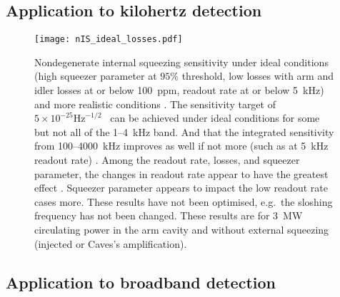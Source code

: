 \subsection{Application to kilohertz detection}

\begin{figure}
    \centering
    \texttt{[image: nIS\_ideal\_losses.pdf]}
    \caption{  Nondegenerate internal squeezing sensitivity under ideal conditions (high squeezer parameter at $95\%$ threshold, low losses with arm and idler losses at or below 100~ppm, readout rate at or below 5~kHz) and more realistic conditions . The sensitivity target of $5\times10^{-25}\text{Hz}^{-1/2}$~\cite{Miao2018} can be achieved under ideal conditions for some but not all of the 1--4~kHz band. And that the integrated sensitivity from 100--4000~kHz improves as well if not more (such as at 5~kHz readout rate) . Among the readout rate, losses, and squeezer parameter, the changes in readout rate appear to have the greatest effect . Squeezer parameter appears to impact the low readout rate cases more. These results have not been optimised, e.g.\ the sloshing frequency has not been changed. These results are for 3~MW circulating power in the arm cavity and without external squeezing (injected or Caves's amplification).}
    \label{fig:nIS_sens_target}
\end{figure}






\subsection{Application to broadband detection}

